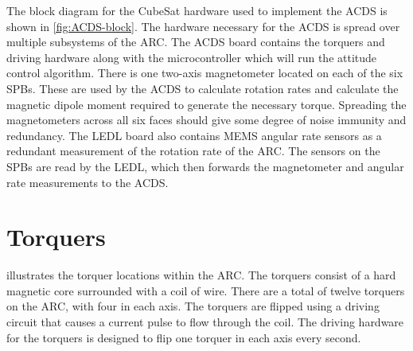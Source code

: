 The block diagram for the CubeSat hardware used to implement the \ac{ACDS} is shown in \cref{fig:ACDS-block}. The hardware necessary for the \ac{ACDS} is spread over multiple subsystems of the \ac{ARC}. The \ac{ACDS} board contains the torquers and driving hardware along with the microcontroller which will run the attitude control algorithm. There is one two-axis magnetometer located on each of the six \acp{SPB}. These are used by the \ac{ACDS} to calculate rotation rates and calculate the magnetic dipole moment required to generate the necessary torque. Spreading the magnetometers across all six faces should give some degree of noise immunity and redundancy. The \ac{LEDL} board also contains \ac{MEMS} angular rate sensors as a redundant measurement of the rotation rate of the \ac{ARC}. The sensors on the \acp{SPB} are read by the \ac{LEDL}, which then forwards the magnetometer and angular rate measurements to the \ac{ACDS}.

\section{Torquers}

 illustrates the torquer locations within the \ac{ARC}. The torquers consist of a hard magnetic core surrounded with a coil of wire. There are a total of twelve torquers on the \ac{ARC}, with four in each axis. The torquers are flipped using a driving circuit that causes a current pulse to flow through the coil. The driving hardware for the torquers is designed to flip one torquer in each axis every second.

